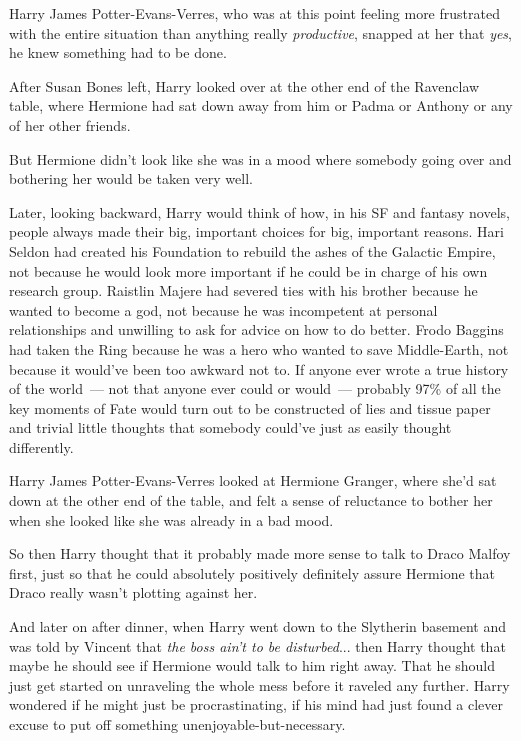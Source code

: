 Harry James Potter-Evans-Verres, who was at this point feeling more frustrated with the entire situation than anything really \emph{productive}, snapped at her that \emph{yes}, he knew something had to be done.

After Susan Bones left, Harry looked over at the other end of the Ravenclaw table, where Hermione had sat down away from him or Padma or Anthony or any of her other friends.

But Hermione didn't look like she was in a mood where somebody going over and bothering her would be taken very well.

Later, looking backward, Harry would think of how, in his SF and fantasy novels, people always made their big, important choices for big, important reasons. Hari Seldon had created his Foundation to rebuild the ashes of the Galactic Empire, not because he would look more important if he could be in charge of his own research group. Raistlin Majere had severed ties with his brother because he wanted to become a god, not because he was incompetent at personal relationships and unwilling to ask for advice on how to do better. Frodo Baggins had taken the Ring because he was a hero who wanted to save Middle-Earth, not because it would've been too awkward not to. If anyone ever wrote a true history of the world~--- not that anyone ever could or would~--- probably 97\% of all the key moments of Fate would turn out to be constructed of lies and tissue paper and trivial little thoughts that somebody could've just as easily thought differently.

Harry James Potter-Evans-Verres looked at Hermione Granger, where she'd sat down at the other end of the table, and felt a sense of reluctance to bother her when she looked like she was already in a bad mood.

So then Harry thought that it probably made more sense to talk to Draco Malfoy first, just so that he could absolutely positively definitely assure Hermione that Draco really wasn't plotting against her.

And later on after dinner, when Harry went down to the Slytherin basement and was told by Vincent that \emph{the boss ain't to be disturbed}... then Harry thought that maybe he should see if Hermione would talk to him right away. That he should just get started on unraveling the whole mess before it raveled any further. Harry wondered if he might just be procrastinating, if his mind had just found a clever excuse to put off something unenjoyable-but-necessary.

